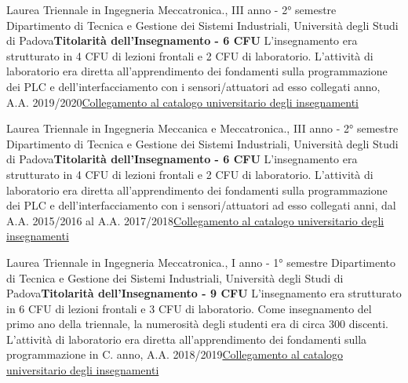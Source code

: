 {
{Laurea Triennale in Ingegneria Meccatronica., III anno - 2° semestre}
{\newline  Dipartimento di Tecnica e Gestione dei Sistemi Industriali, Università degli Studi di Padova\newline \textbf{Titolarità dell'Insegnamento - 6 CFU}\newline
    L'insegnamento era strutturato in 4 CFU di lezioni frontali e 2 CFU di laboratorio. L'attività di laboratorio era diretta all'apprendimento dei fondamenti sulla programmazione dei PLC e dell'interfacciamento con i sensori/attuatori ad esso collegati}{ anno, A.A. 2019/2020}{\href{https://didattica.unipd.it/off/2017/LT/IN/IN2376/000ZZ/INP7078641/N0}{Collegamento al catalogo universitario degli insegnamenti}}

{Laurea Triennale in Ingegneria Meccanica e Meccatronica., III anno - 2° semestre}
{\newline  Dipartimento di Tecnica e Gestione dei Sistemi Industriali, Università degli Studi di Padova\newline \textbf{Titolarità dell'Insegnamento - 6 CFU}\newline
    L'insegnamento  era strutturato in 4 CFU di lezioni frontali e 2 CFU di laboratorio. L'attività di laboratorio era diretta all'apprendimento dei fondamenti sulla programmazione dei PLC e dell'interfacciamento con i sensori/attuatori ad esso collegati}{ anni, dal A.A. 2015/2016 al A.A. 2017/2018}{\href{https://didattica.unipd.it/off/2015/LT/IN/IN0516/000ZZ/INP3058418/N0}{Collegamento al catalogo universitario degli insegnamenti}}


    {Laurea Triennale in Ingegneria Meccatronica., I anno - 1° semestre}
    {\newline  Dipartimento di Tecnica e Gestione dei Sistemi Industriali, Università degli Studi di Padova\newline \textbf{Titolarità dell'Insegnamento - 9 CFU}\newline
        L'insegnamento  era strutturato in 6 CFU di lezioni frontali e 3 CFU di laboratorio. Come insegnamento del primo ano della triennale, la numerosità degli studenti era di circa 300 discenti. L'attività di laboratorio era diretta all'apprendimento dei fondamenti sulla programmazione in C.}{ anno, A.A. 2018/2019}{\href{https://didattica.unipd.it/off/2018/LT/IN/IN2376/000ZZ/IN18103361/N0}{Collegamento al catalogo universitario degli insegnamenti}}

}
